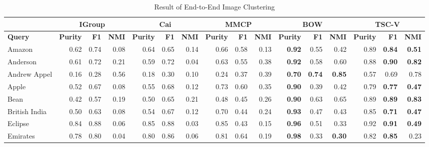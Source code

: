 \begin{table*}[th]
\centering
\caption{Result of End-to-End Image Clustering}
\small
\begin{tabular}{|l|r|r|r|r|r|r|r|r|r|r|r|r|r|r|r|}
\hline
    {\bf } &  \multicolumn{ 3}{|c|}{{\bf IGroup}} &     \multicolumn{ 3}{|c|}{{\bf Cai}} &    \multicolumn{ 3}{|c|}{{\bf MMCP}} &     \multicolumn{ 3}{|c|}{{\bf BOW}} &    \multicolumn{ 3}{|c|}{{\bf TSC-V}} \\
\hline
{\bf Query} & {\bf Purity} &   {\bf F1} &  {\bf NMI} & {\bf Purity} &   {\bf F1} &  {\bf NMI} & {\bf Purity} &   {\bf F1} &  {\bf NMI} & {\bf Purity} &   {\bf F1} &  {\bf NMI} & {\bf Purity} &   {\bf F1} &  {\bf NMI} \\
\hline
    Amazon &      0.62  &      0.74  &      0.08  &      0.64  &      0.65  &      0.14  &      0.66  &      0.58  &      0.13  & {\bf 0.92 } &      0.55  &      0.42  &      0.89  & {\bf 0.84 } & {\bf 0.51 } \\
\hline
  Anderson &      0.61  &      0.72  &      0.21  &      0.59  &      0.72  &      0.04  &      0.63  &      0.55  &      0.38  & {\bf 0.92 } &      0.58  &      0.60  &      0.88  & {\bf 0.90 } & {\bf 0.82 } \\
\hline
Andrew Appel &      0.16  &      0.28  &      0.56  &      0.18  &      0.30  &      0.10  &      0.24  &      0.37  &      0.39  & {\bf 0.70 } & {\bf 0.74 } & {\bf 0.85 } &      0.57  &      0.69  &      0.78  \\
\hline
     Apple &      0.52  &      0.67  &      0.08  &      0.55  &      0.68  &      0.12  &      0.73  &      0.60  &      0.35  & {\bf 0.90 } &      0.39  &      0.42  &      0.79  & {\bf 0.77 } & {\bf 0.47 } \\
\hline
      Bean &      0.42  &      0.57  &      0.19  &      0.50  &      0.65  &      0.21  &      0.48  &      0.45  &      0.26  & {\bf 0.90 } &      0.63  &      0.65  &      0.89  & {\bf 0.89 } & {\bf 0.83 } \\
\hline
British India &      0.50  &      0.63  &      0.08  &      0.54  &      0.67  &      0.12  &      0.70  &      0.44  &      0.24  & {\bf 0.93 } &      0.47  &      0.43  &      0.85  & {\bf 0.71 } & {\bf 0.47 } \\
\hline
   Eclipse &      0.84  &      0.88  &      0.06  &      0.85  &      0.88  &      0.03  &      0.85  &      0.43  &      0.15  & {\bf 0.96 } &      0.51  &      0.33  &      0.92  & {\bf 0.91 } & {\bf 0.49 } \\
\hline
  Emirates &      0.78  &      0.80  &      0.04  &      0.80  &      0.86  &      0.06  &      0.81  &      0.64  &      0.19  & {\bf 0.98 } &      0.33  & {\bf 0.30 } &      0.82  & {\bf 0.85 } &      0.23  \\

\end{tabular}
\end{table*}
